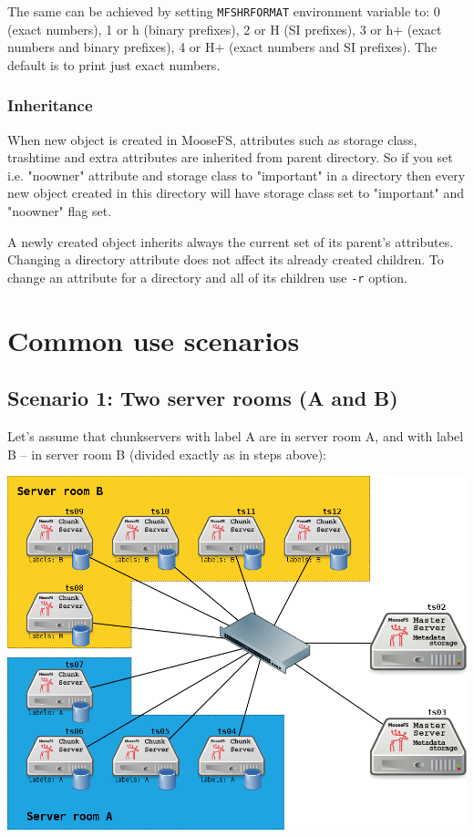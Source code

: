 \documentclass[a4paper,11pt,english]{report}
\def\code#1{\texttt{#1}}
\begin{document}
					The same can be achieved by setting \code{MFSHRFORMAT} environment variable to: 0 (exact numbers), 1 or h (binary prefixes), 2 or H (SI prefixes), 3 or h+ (exact numbers and binary prefixes), 4 or H+ (exact numbers and SI prefixes). The default is to print just exact numbers.
				
				\subsubsection{Inheritance}
					When new object is created in MooseFS, attributes such as storage class, trashtime and extra attributes are inherited from parent directory. So if you set i.e. "noowner" attribute and storage class to "important" in a directory then every new object created in this directory will have  storage class set to "important" and "noowner" flag set.
					
					A newly created object inherits always the current set of its parent's attributes. Changing a directory attribute does not affect its already created children. To change an attribute for a directory and all of its children use \code{-r} option.		
				
		\pagebreak
				
		\section{Common use scenarios}
			\subsection{Scenario 1: Two server rooms (A and B)}
			
			Let's assume that chunkservers with label A are in server room A, and with label B -- in server room B (divided exactly as in steps above):
			
			\includegraphics[scale=0.47]{images/diagram_A_B_v2.png}
			
\end{document}
